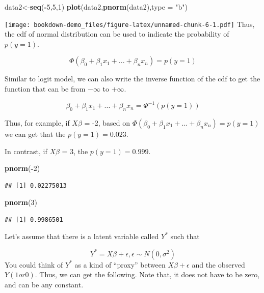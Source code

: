 \documentclass[]{book}
\newenvironment{Shaded}{\begin{snugshade}}{\end{snugshade}}
\newcommand{\DataTypeTok}[1]{\textcolor[rgb]{0.13,0.29,0.53}{#1}}
\newcommand{\DecValTok}[1]{\textcolor[rgb]{0.00,0.00,0.81}{#1}}
\newcommand{\KeywordTok}[1]{\textcolor[rgb]{0.13,0.29,0.53}{\textbf{#1}}}
\newcommand{\NormalTok}[1]{#1}
\newcommand{\OperatorTok}[1]{\textcolor[rgb]{0.81,0.36,0.00}{\textbf{#1}}}
\newcommand{\StringTok}[1]{\textcolor[rgb]{0.31,0.60,0.02}{#1}}
\begin{document}
\begin{Shaded}
\begin{Highlighting}[]
\NormalTok{data2<-}\KeywordTok{seq}\NormalTok{(}\OperatorTok{-}\DecValTok{5}\NormalTok{,}\DecValTok{5}\NormalTok{,}\DecValTok{1}\NormalTok{)}
\KeywordTok{plot}\NormalTok{(data2,}\KeywordTok{pnorm}\NormalTok{(data2),}\DataTypeTok{type =} \StringTok{"b"}\NormalTok{)}
\end{Highlighting}
\end{Shaded}

\texttt{[image: bookdown-demo\_files/figure-latex/unnamed-chunk-6-1.pdf]}
Thus, the cdf of normal distribution can be used to indicate the probability of \(p(y=1)\).

\[\Phi(\beta_0+\beta_1x_1+...+\beta_nx_n )= p(y=1)\]

Similar to logit model, we can also write the inverse function of the cdf to get the function that can be from \(-\infty\) to \(+\infty\).

\[\beta_0+\beta_1x_1+...+\beta_nx_n =\Phi^{-1}(p(y=1))\]

Thus, for example, if \(X\beta\) = -2, based on \(\Phi(\beta_0+\beta_1x_1+...+\beta_nx_n )= p(y=1)\) we can get that the \(p(y=1)=0.023\).

In contrast, if \(X\beta\) = 3, the \(p(y=1)=0.999\).

\begin{Shaded}
\begin{Highlighting}[]
\KeywordTok{pnorm}\NormalTok{(}\OperatorTok{-}\DecValTok{2}\NormalTok{)}
\end{Highlighting}
\end{Shaded}

\begin{verbatim}
## [1] 0.02275013
\end{verbatim}

\begin{Shaded}
\begin{Highlighting}[]
\KeywordTok{pnorm}\NormalTok{(}\DecValTok{3}\NormalTok{)}
\end{Highlighting}
\end{Shaded}

\begin{verbatim}
## [1] 0.9986501
\end{verbatim}

Let's assume that there is a latent variable called \(Y^*\) such that

\[Y^*=X\beta+\epsilon, \epsilon \sim N(0,\sigma^2)\]
You could think of \(Y^*\) as a kind of ``proxy'' between \(X\beta+\epsilon\) and the observed \(Y (1 or 0)\). Thus, we can get the following. Note that, it does not have to be zero, and can be any constant.
\end{document}
